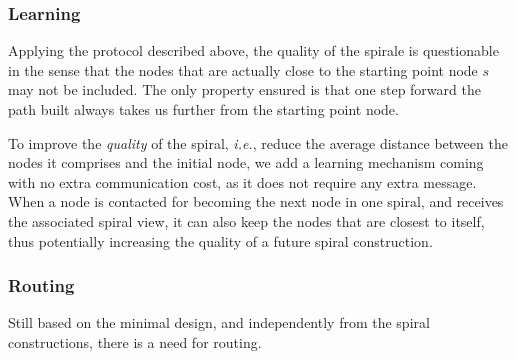 \subsubsection*{Learning}

Applying the protocol described above, the quality of the spirale is
questionable in the sense that the nodes that are actually close to the starting
point node $s$ may not be included. The only property ensured is that one step
forward the path built always takes us further from the starting point node.

To improve the \emph{quality} of the spiral, \emph{i.e.}, reduce the average
distance between the nodes it comprises and the initial node, we add a learning
mechanism coming with no extra communication cost, as it does not require any
extra message. When a node is contacted for becoming the next node in one
spiral, and receives the associated spiral view, it can also keep the nodes that
are closest to itself, thus potentially increasing the quality of a future
spiral construction.

\subsubsection*{Routing}

Still based on the minimal design, and independently from the spiral
constructions, there is a need for routing.




